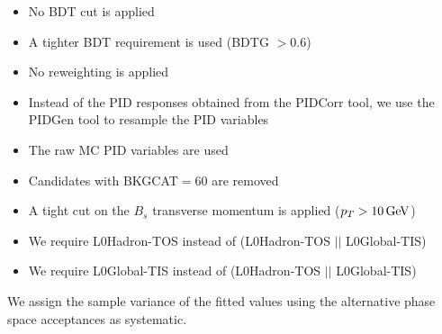 \begin{itemize}

	\item No BDT cut is applied
	
	\item A tighter BDT requirement is used (BDTG $> 0.6$)
	
	
	\item No reweighting is applied 
	
	\item Instead of the PID responses obtained from the \textsf{PIDCorr} tool, we use the \textsf{PIDGen} tool to resample the PID variables \cite{LHCb-INT-2017-007}
	
	\item The raw MC PID variables are used
	
	\item Candidates with \textsf{BKGCAT}$=60$ are removed
	
	\item A tight cut on the $B_s$ transverse momentum is applied ($p_T > 10 \mathrm{\,Ge\kern -0.1em V}$)
	
	\item We require \textsf{L0Hadron}-TOS  instead of (\textsf{L0Hadron}-TOS $\vert \vert$   \textsf{L0Global}-TIS)
	
	\item We require \textsf{L0Global}-TIS  instead of (\textsf{L0Hadron}-TOS  $\vert \vert$  \textsf{L0Global}-TIS)
	
\end{itemize}
We assign the sample variance of the fitted values using the alternative phase space acceptances as systematic.

